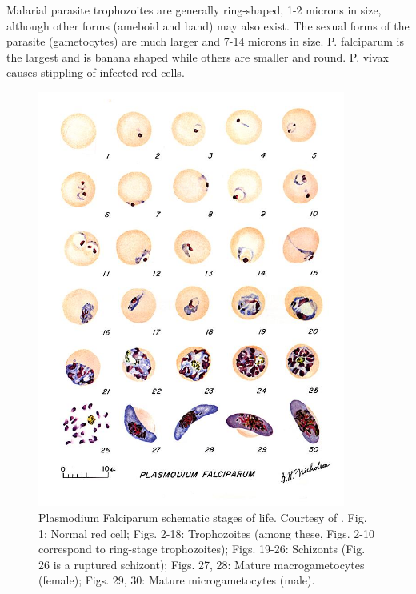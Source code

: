\documentclass[final,a4paper,12pt,english]{UnicaPhdThesis3}
\begin{document}
{Malarial parasite trophozoites are generally ring-shaped, 1-2 microns in size, although other forms (ameboid and band) may also exist. The sexual forms of the parasite (gametocytes) are much larger and 7-14 microns in size. P. falciparum is the largest and is banana shaped while others are smaller and round. P. vivax causes stippling of infected red cells.
\begin{figure}[!htbp]
	\centering
	\includegraphics[width=0.90\textwidth]{images/malaria_th/mal_falc}
	\caption{\label{fig:falci_th} Plasmodium Falciparum schematic stages of life. Courtesy of \cite{Med_cdc}.
	Fig. 1: Normal red cell; Figs. 2-18: Trophozoites (among these, Figs. 2-10 correspond to ring-stage trophozoites); Figs. 19-26: Schizonts (Fig. 26 is a ruptured schizont); Figs. 27, 28: Mature macrogametocytes (female); Figs. 29, 30: Mature microgametocytes (male).}
\end{figure}

}
\end{document}
